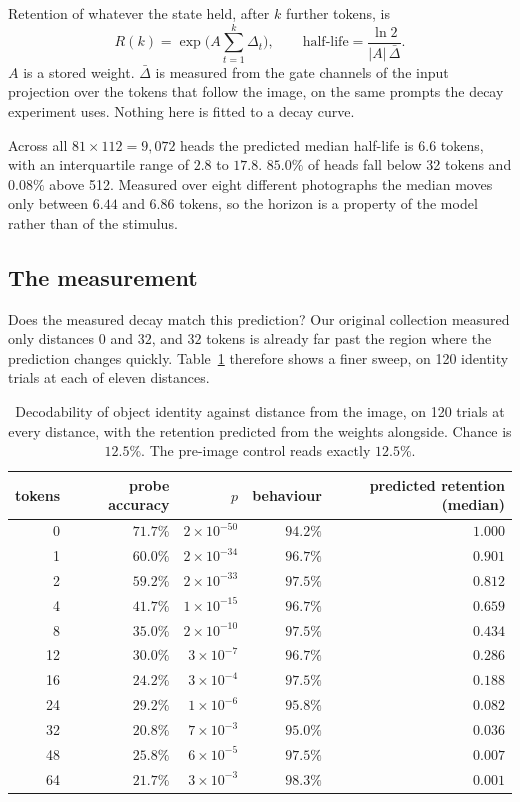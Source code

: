 \documentclass[10pt]{article}
\begin{document}
Retention of whatever the state held, after $k$ further tokens, is
\begin{equation}
R(k) = \exp\!\Big(A \sum_{t=1}^{k}\Delta_t\Big),
\qquad
\text{half-life} = \frac{\ln 2}{|A|\,\bar{\Delta}} .
\end{equation}
$A$ is a stored weight. $\bar{\Delta}$ is measured from the gate channels of the
input projection over the tokens that follow the image, on the same prompts the
decay experiment uses. Nothing here is fitted to a decay curve.

Across all $81 \times 112 = 9{,}072$ heads the predicted median half-life is
$6.6$ tokens, with an interquartile range of $2.8$ to $17.8$. $85.0\%$ of heads
fall below 32 tokens and $0.08\%$ above 512. Measured over eight different
photographs the median moves only between $6.44$ and $6.86$ tokens, so the
horizon is a property of the model rather than of the stimulus.

\subsection{The measurement}

Does the measured decay match this prediction? Our original collection
measured only distances $0$ and $32$, and $32$ tokens is already far past the
region where the prediction changes quickly. Table~\ref{tab:fine} therefore
shows a finer sweep, on 120 identity trials at each of eleven distances.

\begin{table}[h]
\centering\small
\begin{tabular}{rrrrr}
\toprule
tokens & probe accuracy & $p$ & behaviour & predicted retention (median) \\
\midrule
0  & $71.7\%$ & $2\times10^{-50}$ & $94.2\%$ & $1.000$ \\
1  & $60.0\%$ & $2\times10^{-34}$ & $96.7\%$ & $0.901$ \\
2  & $59.2\%$ & $2\times10^{-33}$ & $97.5\%$ & $0.812$ \\
4  & $41.7\%$ & $1\times10^{-15}$ & $96.7\%$ & $0.659$ \\
8  & $35.0\%$ & $2\times10^{-10}$ & $97.5\%$ & $0.434$ \\
12 & $30.0\%$ & $3\times10^{-7}$  & $96.7\%$ & $0.286$ \\
16 & $24.2\%$ & $3\times10^{-4}$  & $97.5\%$ & $0.188$ \\
24 & $29.2\%$ & $1\times10^{-6}$  & $95.8\%$ & $0.082$ \\
32 & $20.8\%$ & $7\times10^{-3}$  & $95.0\%$ & $0.036$ \\
48 & $25.8\%$ & $6\times10^{-5}$  & $97.5\%$ & $0.007$ \\
64 & $21.7\%$ & $3\times10^{-3}$  & $98.3\%$ & $0.001$ \\
\bottomrule
\end{tabular}
\caption{Decodability of object identity against distance from the image, on
120 trials at every distance, with the retention predicted from the weights
alongside. Chance is $12.5\%$. The pre-image control reads exactly $12.5\%$.}
\label{tab:fine}
\end{table}
\end{document}
